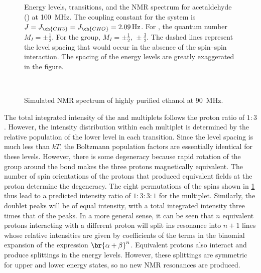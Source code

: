 \documentclass[nobib,nofonts,nols,nohyper]{tufte-handout}
\begin{document}
\begin{figure}[htb]
  \centering
  
  \caption{Energy levels, transitions, and the NMR spectrum for acetaldehyde () at \SI{100}{\MHz}. 
  The coupling constant for the system is \( {J = J_{\ch{CH3}} = J_{\ch{CHO}} = \SI{2.09}{\Hz}} \). 
  For , the quantum number \( {M_I = \pm\tfrac{1}{2}} \). For the  group, \( {M_I = \pm\tfrac{1}{2}, \, \pm\tfrac{3}{2}} \). 
  The dashed lines represent the level spacing that would occur in the absence of the spin--spin interaction.
  The spacing of the energy levels are greatly exaggerated in the figure.}
  \label{fig:spin_splitting}
\end{figure}  

\begin{figure}[htb]
  \centering
  
	\caption{Simulated NMR spectrum of highly purified ethanol at \SI{90}{\MHz}.}\
	\label{fig:EtOH_spectrum}
\end{figure}
The total integrated intensity of the  and  multiplets follows the proton ratio of \( 1{:}3 \). 
However, the intensity distribution within each multiplet is determined by the relative population of the lower level in each transition. 
Since the level spacing is much less than \( kT \), the Boltzmann population factors are essentially identical for these levels. 
However, there is some degeneracy because rapid rotation of the  group around the \ch{C-C} bond makes the three protons magnetically equivalent. 
The number of spin orientations of the  protons that produced equivalent fields at the  proton determine the degeneracy. 
The eight permutations of the  spins shown in \cref{fig:spin_splitting} thus lead to a predicted intensity ratio of \( 1{:}3{:}3{:}1 \) for the  multiplet. 
Similarly, the \ch{CH3} doublet peaks will be of equal intensity, with a total integrated intensity three times that of the \ch{CH} peaks. 
In a more general sense, it can be seen that \( n \) equivalent protons interacting with a different proton will split ins resonance into \( n + 1 \) lines whose relative intensities are given by coefficients of the terms in the binomial expansion of the expression \( \br{\alpha + \beta}^n \). 
Equivalent protons also interact and produce splittings in the energy levels. 
However, these splittings are symmetric for upper and lower energy states, so no new NMR resonances are produced. 
\end{document}
